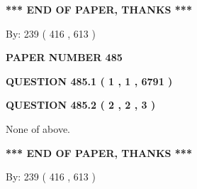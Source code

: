 \documentclass[12pt]{article}
\begin{document}
 
 
 
   
   
 \vspace{0.2in}
 
   
   
   
   
\vspace{1.0in} 
{\textbf{\large{ *** END OF PAPER, THANKS *** }}} 
   
   
\hspace{1.0in} By: 
 239 ( 416 ,  613 )
   
   
   
   
\newpage 
\setcounter{page}{ 
   485001 } 
   
   
   
   
 {\textbf{ \Large{ PAPER NUMBER  485  }}}
   
   
\vspace{0.2in}
   
   
   
   
   
   
 \vspace{0.2in}
 
 
 
 
   
   
  
\vspace{0.2in}
  
{\textbf{\Large{QUESTION
485.1 
 ( 1 , 1 , 6791 )
}}}
  
  
  
\vspace{0.2in}
  
{\textbf{\Large{QUESTION
485.2 
 ( 2 , 2 , 3 )
}}}
  
  
 
 
\noindent{}
 
 
 None of above.
 
 
 
 
   
   
 \vspace{0.2in}
 
   
   
   
   
\vspace{1.0in} 
{\textbf{\large{ *** END OF PAPER, THANKS *** }}} 
   
   
\hspace{1.0in} By: 
 239 ( 416 ,  613 )
   
\end{document}
